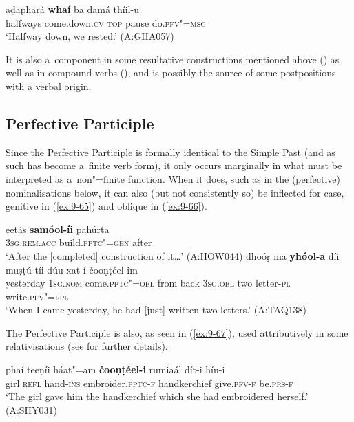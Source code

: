 \begin{exe}
\ex
\label{ex:9-64}
\gll aḍaphará \textbf{whaí} ba damá thíil-u \\
halfways come.down.\textsc{cv} \textsc{top} pause do.\textsc{pfv"=msg} \\
\glt `Halfway down, we rested.' (A:GHA057)
\end{exe}

It is also a~component in some resultative constructions mentioned above () as well as in compound verbs (), and is possibly the source of some postpositions with a verbal origin.


\subsection{Perfective Participle}
\label{subsec:9-3-2}


Since the Perfective Participle is formally identical to the Simple Past (and as such has become a~finite verb form), it only occurs marginally in what must be interpreted as a~non"=finite function. When it does, such as in the (perfective) nominalisations below, it can also (but not consistently so) be inflected for case, genitive in (\ref{ex:9-65}) and oblique in (\ref{ex:9-66}).

\begin{exe}
\ex
\label{ex:9-65}
\gll eetás \textbf{samóol-íi} pahúrta \\
\textsc{3sg.rem.acc} build.\textsc{pptc"=gen} after \\
\glt `After the [completed] construction of it{\ldots}' (A:HOW044)
\ex
\label{ex:9-66}
\gll dhoóṛ ma \textbf{yhóol-a} díi muṣṭú tíi dúu xat-í čooṇṭéel-im\\
yesterday 1\textsc{sg.nom} come.\textsc{pptc"=obl} from back \textsc{3sg.obl} two letter-\textsc{pl} write.\textsc{pfv"=fpl}\\
\glt `When I came yesterday, he had [just] written two letters.' (A:TAQ138)
\end{exe}

The Perfective Participle is also, as seen in (\ref{ex:9-67}), used attributively in some relativisations (see  for further details).

\begin{exe}
\ex
\label{ex:9-67}
\gll phaí teeṇíi háat"=am \textbf{čooṇṭéel-i} rumiaál dít-i hín-i \\
girl \textsc{refl} hand-\textsc{ins} embroider.\textsc{pptc-f} handkerchief give.\textsc{pfv-f} be.\textsc{prs-f} \\
\glt `The girl gave him the handkerchief which she had embroidered herself.' (A:SHY031)
\end{exe}

